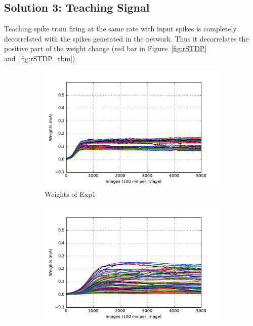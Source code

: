 \subsection{Solution 3: Teaching Signal}
Teaching spike train firing at the same rate with input spikes is completely decorrelated with the spikes generated in the network.
Thus it decorrelates the positive part of the weight change (red bar in Figure~\ref{fig:rSTDP} and~\ref{fig:rSTDP_rbm}).
\begin{figure}
	\centering
	\begin{subfigure}[t]{0.4\textwidth}
		\includegraphics[width=\textwidth]{pics_sdlm/05_exp_SAE_teach_long/exp1_weights_s.pdf}
		\caption{Weights of Exp1}
	\end{subfigure}
	\begin{subfigure}[t]{0.4\textwidth}
		\includegraphics[width=\textwidth]{pics_sdlm/05_exp_SAE_teach_long/exp2_weights_s.pdf}

\end{subfigure}
\end{figure}
